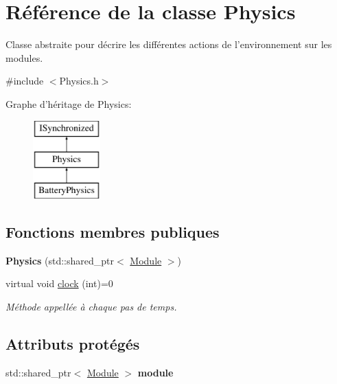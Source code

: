 \hypertarget{classPhysics}{\section{Référence de la classe Physics}
\label{classPhysics}
}


Classe abstraite pour décrire les différentes actions de l'environnement sur les modules.  




{\ttfamily \#include $<$Physics.\-h$>$}

Graphe d'héritage de Physics\-:\begin{figure}[H]
\begin{center}
\leavevmode
\includegraphics[height=3.000000cm]{classPhysics}
\end{center}
\end{figure}
\subsection*{Fonctions membres publiques}
\begin{DoxyCompactItemize}
\item 
\hypertarget{classPhysics_a6007da7545dc8ba917cd3b97439d4548}{{\bfseries Physics} (std\-::shared\-\_\-ptr$<$ \hyperlink{classModule}{Module} $>$)}\label{classPhysics_a6007da7545dc8ba917cd3b97439d4548}

\item 
\hypertarget{classPhysics_a041a4739fb28602797808c646c8018fa}{virtual void \hyperlink{classPhysics_a041a4739fb28602797808c646c8018fa}{clock} (int)=0}\label{classPhysics_a041a4739fb28602797808c646c8018fa}

\begin{DoxyCompactList}\small\item\em Méthode appellée à chaque pas de temps. \end{DoxyCompactList}\end{DoxyCompactItemize}
\subsection*{Attributs protégés}
\begin{DoxyCompactItemize}
\item 
\hypertarget{classPhysics_a059d7b72c91f5964fc3e3f3d5a189e9d}{std\-::shared\-\_\-ptr$<$ \hyperlink{classModule}{Module} $>$ {\bfseries module}}\label{classPhysics_a059d7b72c91f5964fc3e3f3d5a189e9d}

\end{DoxyCompactItemize}


